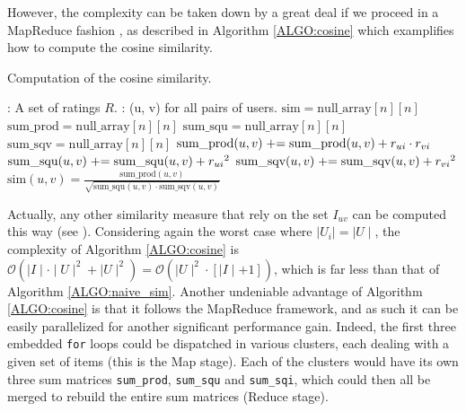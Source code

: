 However, the complexity can be taken down by a great deal if we proceed in a
MapReduce fashion \cite{DeaGhe04}, as described in Algorithm \ref{ALGO:cosine}
which examplifies how to compute the cosine similarity.
\begin{algorithm}[!ht]
 \caption{Computation of the cosine similarity.}
       \label{ALGO:cosine}
       \begin{algorithmic}

         : A set of ratings $R$.
         : (u, v) for all pairs of users.
         \STATE $\text{sim} = \text{null\_array}[n][n]$
         \STATE $\text{sum\_prod} = \text{null\_array}[n][n]$
         \STATE $\text{sum\_squ} = \text{null\_array}[n][n]$
         \STATE $\text{sum\_sqv} = \text{null\_array}[n][n]$
              \STATE $\text{sum\_prod}(u, v) \mathrel{+}= \text{sum\_prod}(u, v) +
              r_{ui} \cdot r_{vi}$
              \STATE $\text{sum\_squ}(u, v) \mathrel{+}= \text{sum\_squ}(u, v) +
              {r_{ui}}^2$
              \STATE $\text{sum\_sqv}(u, v) \mathrel{+}= \text{sum\_sqv}(u, v) +
              {r_{vi}}^2$
             \ENDFOR
           \ENDFOR
         \ENDFOR
           \STATE $\text{sim}(u, v) = \frac{\text{sum\_prod}(u,
           v)}{\sqrt{\text{sum\_squ}(u, v) \cdot \text{sum\_sqv}(u, v)}}$
           \ENDFOR
         \ENDFOR
\end{algorithmic}
\end{algorithm}
Actually, any other similarity measure that rely on the set $I_{uv}$ can be
computed this way (see \cite{SchBodVolRECSYS12}). Considering again the worst
case where $\mid U_i \mid = \mid U \mid$, the complexity of Algorithm
\ref{ALGO:cosine} is  $\mathcal{O}(\mid I \mid \cdot \mid U \mid^2 + \mid
U \mid^2) = \mathcal{O}( \mid U \mid^2 \cdot [ \mid I \mid + 1])$, which is far
less than that of Algorithm \ref{ALGO:naive_sim}. Another undeniable advantage
of Algorithm  \ref{ALGO:cosine} is that it follows the MapReduce framework, and
as such it can be easily parallelized for another significant performance gain.
Indeed, the first three embedded \texttt{for} loops could be dispatched in various
clusters, each dealing with a given set of items (this is the Map stage). Each
of the clusters would have its own three sum matrices \texttt{sum\_prod},
\texttt{sum\_squ} and \texttt{sum\_sqi}, which could then all be merged to
rebuild the entire sum matrices (Reduce stage).

